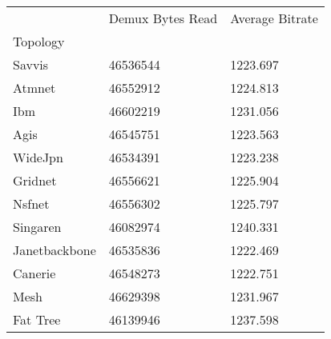 \begin{tabular}{lll}
 & Demux Bytes Read & Average Bitrate \\
Topology &  &  \\
Savvis & 46536544 & 1223.697 \\
Atmnet & 46552912 & 1224.813 \\
Ibm & 46602219 & 1231.056 \\
Agis & 46545751 & 1223.563 \\
WideJpn & 46534391 & 1223.238 \\
Gridnet & 46556621 & 1225.904 \\
Nsfnet & 46556302 & 1225.797 \\
Singaren & 46082974 & 1240.331 \\
Janetbackbone & 46535836 & 1222.469 \\
Canerie & 46548273 & 1222.751 \\
Mesh & 46629398 & 1231.967 \\
Fat Tree & 46139946 & 1237.598 \\
\end{tabular}
